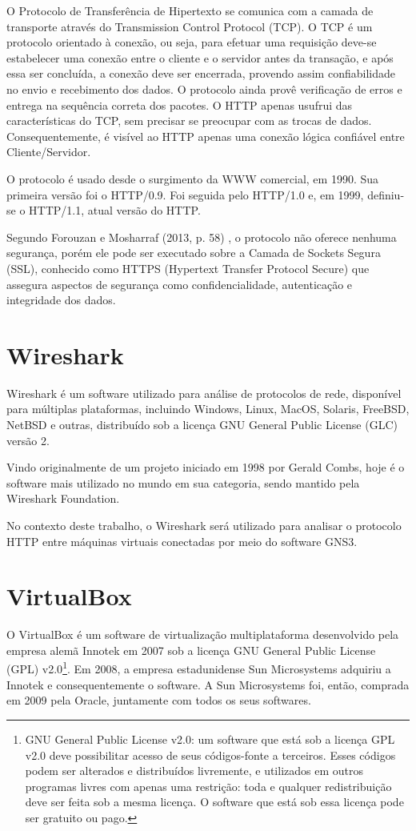 O Protocolo de Transferência de Hipertexto se comunica com a camada de transporte através do Transmission Control Protocol (TCP). O TCP é um protocolo orientado à conexão, ou seja, para efetuar uma requisição deve-se estabelecer uma conexão entre o cliente e o servidor antes da transação, e após essa ser concluída, a conexão deve ser encerrada, provendo assim confiabilidade no envio e recebimento dos dados. O protocolo ainda provê verificação de erros e entrega na sequência correta dos pacotes. O HTTP apenas usufrui das características do TCP, sem precisar se preocupar com as trocas de dados. Consequentemente, é visível ao HTTP apenas uma conexão lógica confiável entre Cliente/Servidor.

O protocolo é usado desde o surgimento da WWW comercial, em 1990. Sua primeira versão foi o HTTP/0.9. Foi seguida pelo HTTP/1.0 e, em 1999, definiu-se o HTTP/1.1, atual versão do HTTP.

Segundo Forouzan e Mosharraf (2013, p. 58) \cite{forouzanb}, o protocolo não oferece nenhuma segurança, porém ele pode ser executado sobre a Camada de Sockets Segura (SSL), conhecido como HTTPS (Hypertext Transfer Protocol Secure) que assegura aspectos de segurança como confidencialidade, autenticação e integridade dos dados.

\section{Wireshark}



Wireshark é um software utilizado para análise de protocolos de rede, disponível para múltiplas plataformas, incluindo Windows, Linux, MacOS, Solaris, FreeBSD, NetBSD e outras, distribuído sob a licença GNU General Public License (GLC) versão 2.

Vindo originalmente de um projeto iniciado em 1998 por Gerald Combs, hoje é o software mais utilizado no mundo em sua categoria, sendo mantido pela Wireshark Foundation.

No contexto deste trabalho, o Wireshark será utilizado para analisar o protocolo HTTP entre máquinas virtuais conectadas por meio do software GNS3.

\section{VirtualBox}

O VirtualBox é um software de virtualização multiplataforma desenvolvido pela empresa alemã Innotek em 2007 sob a licença GNU General Public License (GPL) v2.0\footnote[1]{GNU General Public License v2.0: um software que está sob a licença GPL v2.0 deve possibilitar acesso de seus códigos-fonte a terceiros. Esses códigos podem ser alterados e distribuídos livremente, e utilizados em outros programas livres com apenas uma restrição: toda e qualquer redistribuição deve ser feita sob a mesma licença. O software que está sob essa licença pode ser gratuito ou pago.}. Em 2008, a empresa estadunidense Sun Microsystems adquiriu a Innotek e consequentemente o software. A Sun Microsystems foi, então, comprada em 2009 pela Oracle, juntamente com todos os seus softwares. 	
	
